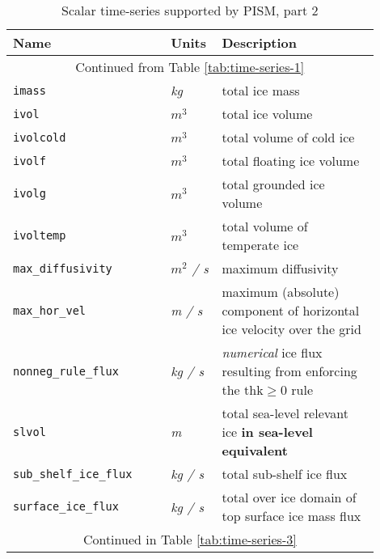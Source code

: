 \begin{table}[ht]
  \centering
 \begin{tabular}{p{0.4\linewidth}p{0.1\linewidth}p{0.4\linewidth}}
    \toprule
    \textbf{Name} & \textbf{Units} & \textbf{Description}\\
    \midrule
    \multicolumn{3}{c}{Continued from Table \ref{tab:time-series-1}}\\
    \texttt{imass} & \textsl{kg} &  total ice mass \\
    \texttt{ivol} & \textsl{$m^{3}$} &  total ice volume \\
    \texttt{ivolcold} & \textsl{$m^{3}$} &  total volume of cold ice \\
    \texttt{ivolf} & \textsl{$m^{3}$} &  total floating ice volume \\
    \texttt{ivolg} & \textsl{$m^{3}$} &  total grounded ice volume \\
    \texttt{ivoltemp} & \textsl{$m^{3}$} &  total volume of temperate ice \\
    \texttt{max_diffusivity} & \textsl{$m^{2}$  / s} &  maximum diffusivity \\
    \texttt{max_hor_vel} & \textsl{m  / s} &  maximum (absolute) component of horizontal ice velocity over the grid \\
    \texttt{nonneg_rule_flux} & \textsl{kg  / s} &  \emph{numerical} ice flux resulting from enforcing the $\mathrm{thk} \ge 0$ rule \\
    \texttt{slvol} & \textsl{m} &  total sea-level relevant ice \textbf{in sea-level equivalent} \\
    \texttt{sub_shelf_ice_flux} & \textsl{kg  / s} &  total sub-shelf ice flux \\
    \texttt{surface_ice_flux} & \textsl{kg  / s} &  total over ice domain of top surface ice mass flux \\
    \multicolumn{3}{c}{Continued in Table \ref{tab:time-series-3}}\\
    \bottomrule
  \end{tabular}
\caption{Scalar time-series supported by PISM, part 2}
\label{tab:time-series-2}
\end{table}

